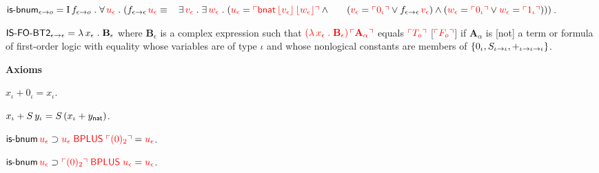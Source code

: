 \begin{biformthy}
    \item $\mbox{\sf is-bnum}_{\epsilon \rightarrow o} = 
      \mbox{\rm I}\, f_{\epsilon \rightarrow o} \mathrel.
      \forall\, \textcolor{red}{u_\epsilon} \mathrel.
      (f_{\epsilon \rightarrow \epsilon} \, \textcolor{red}{u_\epsilon} \equiv {}\\
      \hspace*{2ex}\exists\, \textcolor{red}{v_\epsilon} \mathrel. 
      \exists\, \textcolor{red}{w_\epsilon} \mathrel.
      (\textcolor{red}{u_\epsilon} = \textcolor{red}{\ulcorner\mbox{\sf bnat} \, 
      \lfloor v_\epsilon\rfloor \, \lfloor w_\epsilon\rfloor\urcorner} \wedge {}\\
      \hspace*{4ex}(\textcolor{red}{v_\epsilon} = \textcolor{red}{\ulcorner0_\iota\urcorner} \vee 
      f_{\epsilon \rightarrow \epsilon} \, \textcolor{red}{v_\epsilon}) \wedge
      (\textcolor{red}{w_\epsilon} = \textcolor{red}{\ulcorner0_\iota\urcorner} \vee 
      \textcolor{red}{w_\epsilon} = \textcolor{red}{\ulcorner1_\iota\urcorner})))$.

    \item $\mbox{\sf IS-FO-BT2}_{\epsilon \rightarrow \epsilon} = \lambda\,
      x_\epsilon \mathrel. \textbf{B}_\epsilon$ {\sglsp} where
      $\textbf{B}_\epsilon$ is a complex expression such that
      $\textcolor{red}{(\lambda\, x_\epsilon \mathrel. \textbf{B}_\epsilon) \,
        \ulcorner\textbf{A}_\alpha\urcorner}$ equals $\textcolor{red}{\ulcorner T_o\urcorner}$
      [$\textcolor{red}{\ulcorner F_o\urcorner}$] if $\textbf{A}_\alpha$ is [not] a term
      or formula of first-order logic with equality whose variables
      are of type $\iota$ and whose nonlogical constants are members
      of ${\{ 0_\iota,S_{\iota \rightarrow \iota},+_{\iota \rightarrow \iota
          \rightarrow \iota} \}}$.
      
  \ee

  \item[] \textbf{Axioms}

  \be

    \setcounter{enumi}{2}

    \item $x_\iota + 0_\iota = x_\iota$.

    \item $x_\iota + S \, y_\iota = S \, (x_\iota + y_{\sf
      nat})$.

    \item $\mbox{\sf is-bnum} \, \textcolor{red}{u_\epsilon} \supset
      \textcolor{red}{u_\epsilon \; \mbox{\sf BPLUS} \; \ulcorner(0)_2\urcorner} =
      \textcolor{red}{u_\epsilon}$.

    \item $\mbox{\sf is-bnum} \, \textcolor{red}{u_\epsilon} \supset
      \textcolor{red}{\ulcorner(0)_2\urcorner \; \mbox{\sf BPLUS} \; u_\epsilon} =
      \textcolor{red}{u_\epsilon}$.


\end{biformthy}
